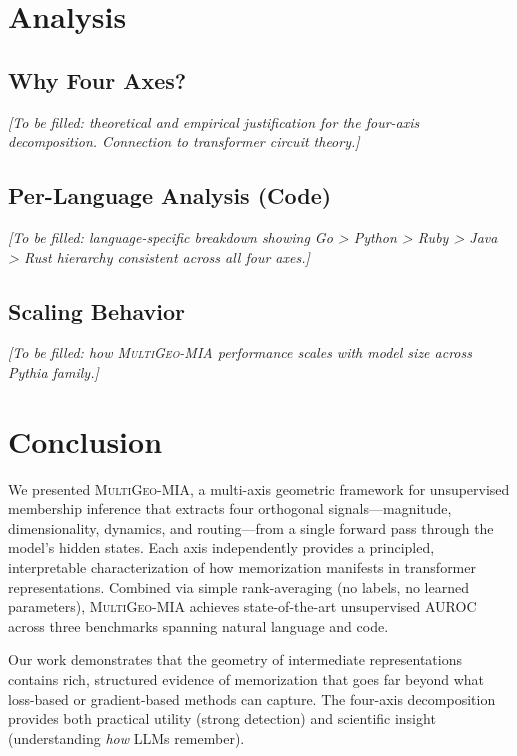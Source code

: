 \documentclass[11pt]{article}
\newcommand{\ours}{\textsc{MultiGeo-MIA}}
\begin{document}
\section{Analysis}
\label{sec:analysis}

\subsection{Why Four Axes?}

\textit{[To be filled: theoretical and empirical justification for the four-axis decomposition. Connection to transformer circuit theory.]}

\subsection{Per-Language Analysis (Code)}

\textit{[To be filled: language-specific breakdown showing Go > Python > Ruby > Java > Rust hierarchy consistent across all four axes.]}

\subsection{Scaling Behavior}

\textit{[To be filled: how \ours{} performance scales with model size across Pythia family.]}

\section{Conclusion}
\label{sec:conclusion}

We presented \ours{}, a multi-axis geometric framework for unsupervised membership inference that extracts four orthogonal signals---magnitude, dimensionality, dynamics, and routing---from a single forward pass through the model's hidden states.
Each axis independently provides a principled, interpretable characterization of how memorization manifests in transformer representations.
Combined via simple rank-averaging (no labels, no learned parameters), \ours{} achieves state-of-the-art unsupervised AUROC across three benchmarks spanning natural language and code.

Our work demonstrates that the geometry of intermediate representations contains rich, structured evidence of memorization that goes far beyond what loss-based or gradient-based methods can capture.
The four-axis decomposition provides both practical utility (strong detection) and scientific insight (understanding \textit{how} LLMs remember).
\end{document}
